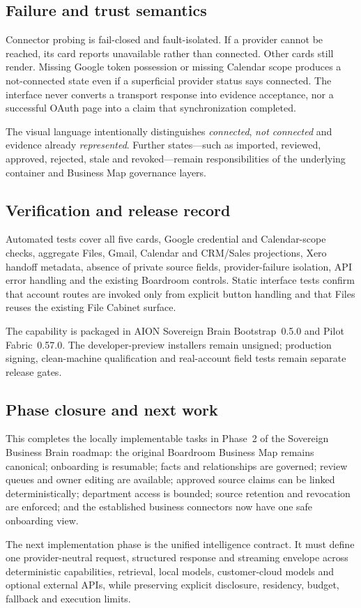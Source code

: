 \subsection{Failure and trust semantics}

Connector probing is fail-closed and fault-isolated.  If a provider cannot be reached,
its card reports unavailable rather than connected.  Other cards still render.  Missing
Google token possession or missing Calendar scope produces a not-connected state even
if a superficial provider status says connected.  The interface never converts a
transport response into evidence acceptance, nor a successful OAuth page into a claim
that synchronization completed.

The visual language intentionally distinguishes \emph{connected}, \emph{not connected}
and evidence already \emph{represented}.  Further states---such as imported, reviewed,
approved, rejected, stale and revoked---remain responsibilities of the underlying
container and Business Map governance layers.

\subsection{Verification and release record}

Automated tests cover all five cards, Google credential and Calendar-scope checks,
aggregate Files, Gmail, Calendar and CRM/Sales projections, Xero handoff metadata,
absence of private source fields, provider-failure isolation, API error handling and
the existing Boardroom controls.  Static interface tests confirm that account routes
are invoked only from explicit button handling and that Files reuses the existing File
Cabinet surface.

The capability is packaged in AION Sovereign Brain Bootstrap~0.5.0 and Pilot
Fabric~0.57.0.  The developer-preview installers remain unsigned; production signing,
clean-machine qualification and real-account field tests remain separate release gates.

\subsection{Phase closure and next work}

This completes the locally implementable tasks in Phase~2 of the Sovereign Business
Brain roadmap: the original Boardroom Business Map remains canonical; onboarding is
resumable; facts and relationships are governed; review queues and owner editing are
available; approved source claims can be linked deterministically; department access is
bounded; source retention and revocation are enforced; and the established business
connectors now have one safe onboarding view.

The next implementation phase is the unified intelligence contract.  It must define one
provider-neutral request, structured response and streaming envelope across deterministic
capabilities, retrieval, local models, customer-cloud models and optional external APIs,
while preserving explicit disclosure, residency, budget, fallback and execution limits.
